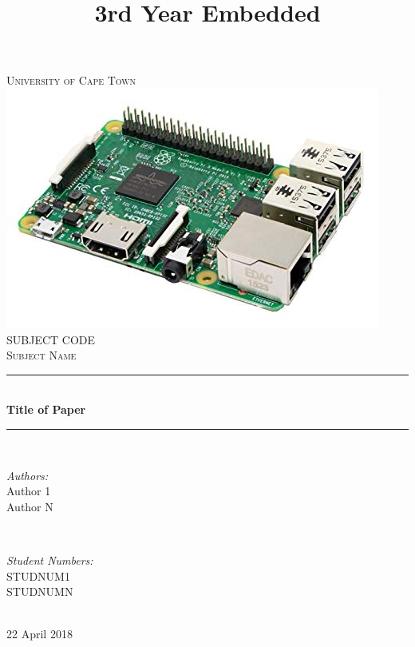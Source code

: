 \title{3rd Year Embedded}


\begin{titlepage}
	\centering
	\vspace*{0.5 cm}
	
	\textsc{\LARGE University of Cape Town}\\[2.0 cm]	%
	\includegraphics[scale = 0.5]{Figures/rpi.jpg}\\[1 cm]	%
	\textsc{\Large SUBJECT CODE}\\[0.5 cm]				%
	\textsc{\large Subject Name}\\[0.5 cm]				%
	\rule{\linewidth}{0.2 mm} \\[0.4 cm]
	{ \huge \bfseries Title of Paper}\\
	\rule{\linewidth}{0.2 mm} \\[1.5 cm]
	
	\begin{minipage}{0.4\textwidth}
		\begin{flushleft} \large
			\emph{Authors:}\\
			Author 1\\
            Author N
		\end{flushleft}
	\end{minipage}~
	\begin{minipage}{0.4\textwidth}
		\begin{flushright} \large
			\emph{Student Numbers:} \\
			STUDNUM1\\	
            STUDNUMN
		\end{flushright}
	\end{minipage}\\[2 cm]
	
	{\large 22 April 2018}\\[2 cm]
	
	\vfill
	
\end{titlepage}